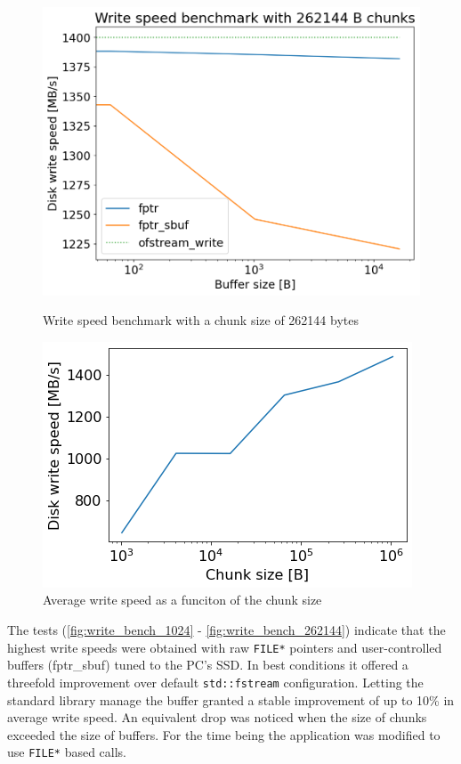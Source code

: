   \begin{figure}[H]
    \centering
    \begin{minipage}{.45\textwidth}
      \centering
      \includegraphics[width=\linewidth]{media/write_bench_262144.png}
      \caption{Write speed benchmark with a chunk size of 262144 bytes}
      \label{fig:write_bench_262144}
    \end{minipage}%
    \hfill
    \begin{minipage}{.45\textwidth}
      \centering
      \includegraphics[width=\linewidth]{media/chunk_bench.png}
      \caption{Average write speed as a funciton of the chunk size}
      \label{fig:chunk_bench}
    \end{minipage}
  \end{figure}


The tests (\autoref{fig:write_bench_1024} - \autoref{fig:write_bench_262144})
indicate that the highest write speeds were obtained with
raw \lstinline{FILE*} pointers and user-controlled buffers (fptr\_sbuf) tuned
to the PC's SSD. In best conditions it offered a threefold improvement
over default \lstinline{std::fstream} configuration. Letting the standard
library manage the buffer granted a stable improvement of up to 10\% 
in average write speed. An equivalent drop was noticed when the size of 
chunks exceeded the size of buffers. For the time being the application 
was modified to use \lstinline{FILE*} based calls.

